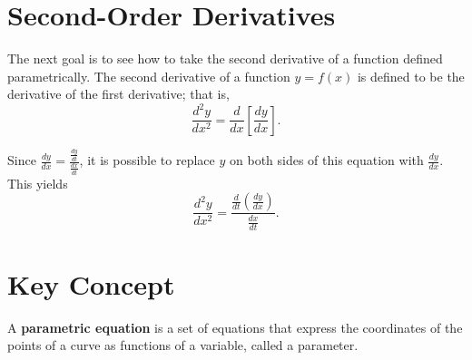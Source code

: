 \documentclass{article}
\begin{document}
\section*{Second-Order Derivatives}
\begin{theorembox}
The next goal is to see how to take the second derivative of a function defined parametrically. The second derivative of a function \( y = f(x) \) is defined to be the derivative of the first derivative; that is,  
\[
\frac{d^2y}{dx^2} = \frac{d}{dx} \left[ \frac{dy}{dx} \right].
\]  

Since \( \frac{dy}{dx} = \frac{\frac{dy}{dt}}{\frac{dx}{dt}} \), it is possible to replace \( y \) on both sides of this equation with \( \frac{dy}{dx} \). This yields
\[
\frac{d^2y}{dx^2} = \frac{\frac{d}{dt}\left( \frac{dy}{dx} \right)}{\frac{dx}{dt}}.
\]
\end{theorembox}



\section*{Key Concept}
\begin{definitionbox}
A \textbf{parametric equation} is a set of equations that express the coordinates of the points of a curve as functions of a variable, called a parameter.
\end{definitionbox}
\end{document}
